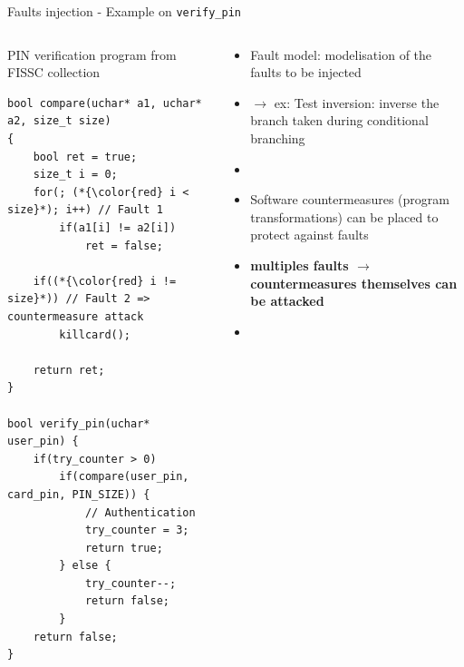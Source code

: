 \begin{frame}{Faults injection - Example on \texttt{verify\_pin}}
    \begin{columns}
        \begin{column}{0.55\textwidth}
            \begin{small}
                PIN verification program from FISSC \cite{Dureuil/PPLCC16} collection                
            \end{small}
            \vspace{0.2cm}
            
            \begin{lstlisting}
bool compare(uchar* a1, uchar* a2, size_t size)
{
    bool ret = true;
    size_t i = 0; 
    for(; (*{\color{red} i < size}*); i++) // Fault 1
        if(a1[i] != a2[i])
            ret = false;
            
    if((*{\color{red} i != size}*)) // Fault 2 => countermeasure attack
        killcard(); 
        
    return ret;
}

bool verify_pin(uchar* user_pin) {
    if(try_counter > 0)  
        if(compare(user_pin, card_pin, PIN_SIZE)) {
            // Authentication
            try_counter = 3;
            return true;
        } else {
            try_counter--;
            return false;
        }
    return false;
}
            \end{lstlisting}	
        	\vfill
        \end{column}
        \begin{column}{0.45\textwidth}
        	\begin{small}
                 \begin{itemize}
                     \item Fault model: modelisation of the faults to be injected
                     \item[] $\rightarrow$ ex: Test inversion: inverse the branch taken during conditional branching
                     \item[]
                     \item Software countermeasures (program transformations) can be placed to protect against faults
                     \item[] \textbf{multiples faults $\rightarrow$ countermeasures themselves can be attacked }
                     \item[]
                 \end{itemize}
    	    \end{small}
            \vfill
        \end{column}
    \end{columns}
\end{frame}


